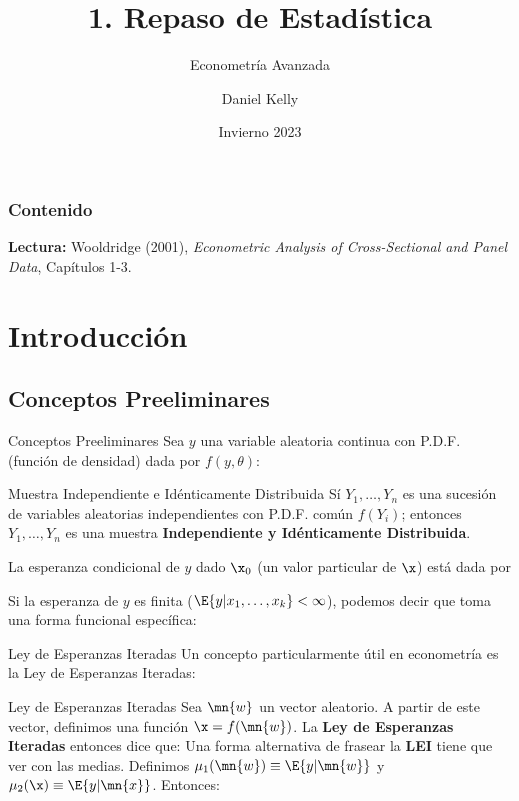 \documentclass[10pt,usenames,dvipsnames]{beamer}
\title{\textbf{1. Repaso de Estadística}}
\subtitle{Econometría Avanzada}
\author[Daniel Kelly (Colmex)]{Daniel Kelly}
\institute[Colmex]{El Colegio de México}
\date{Invierno 2023}
\begin{document}
\begin{frame}[plain]
    \titlepage
\end{frame}

{
\begin{frame}[plain]
    \frametitle{Contenido}
    \tableofcontents
\end{frame}
}

\begin{frame}[plain]
\textbf{Lectura:} Wooldridge (2001), \textit{Econometric Analysis of Cross-Sectional and Panel Data}, Capítulos 1-3.
\end{frame}

\section{Introducción}

\subsection{Conceptos Preeliminares}

\begin{frame}{Conceptos Preeliminares}
Sea $y$ una variable aleatoria continua con P.D.F. (función de densidad) dada por $f(y,\theta)$:

\bigskip
\begin{exampleblock}{Muestra Independiente e Idénticamente Distribuida}
Sí ${Y_1,\hdots,Y_n}$ es una sucesión de variables aleatorias independientes con P.D.F. común $f(Y_i)$; entonces ${Y_1,\hdots,Y_n}$ es una muestra \textbf{Independiente y Idénticamente Distribuida}.
\end{exampleblock}
\end{frame}

\begin{frame}
    La esperanza condicional de $y$ dado $\x_0$ (un valor particular de $\x$) está dada por 
\pause

\bigskip
Si la esperanza de $y$ es finita ($\E{y|x_1,\hdots,x_k}<\infty$), podemos decir que toma una forma funcional específica:
\end{frame}

\begin{frame}{Ley de Esperanzas Iteradas}
    Un concepto particularmente útil en econometría es la Ley de Esperanzas Iteradas:

\begin{exampleblock}{Ley de Esperanzas Iteradas}
    Sea $\mn{w}$ un vector aleatorio. A partir de este vector, definimos una función $\x=f(\mn{w})$. La \textbf{Ley de Esperanzas Iteradas} entonces dice que:
    Una forma alternativa de frasear la \textbf{LEI} tiene que ver con las medias. Definimos $\mu_1(\mn{w})\equiv \E{y|\mn{w}}$ y  $\mu_2(\x)\equiv \E{y|\mn{x}}$. Entonces:
\end{exampleblock}
\end{frame}
\end{document}
